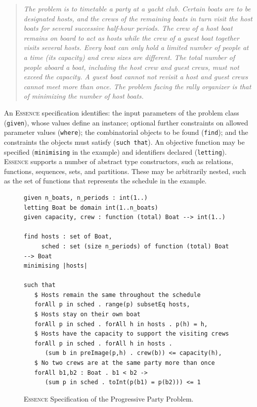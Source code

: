 \documentclass[a4paper,UKenglish,cleveref, autoref,pdfa]{lipics-v2021}
\newcommand{\code}[1]{{\lstinline!#1!}}
\newcommand{\essence}[0]{\textsc{Essence}\xspace}
\begin{document}
\begin{quote}
\em
The problem is to timetable a party at a yacht club. Certain boats are to be designated hosts, and the crews of the remaining boats in turn visit the host boats for several successive half-hour periods. The crew of a host boat remains on board to act as hosts while the crew of a guest boat together visits several hosts. Every boat can only hold a limited number of people at a time (its capacity) and crew sizes are different. The total number of people aboard a boat, including the host crew and guest crews, must not exceed the capacity. A guest boat cannot not revisit a host and guest crews cannot meet more than once. The problem facing the rally organizer is that of minimizing the number of host boats.
\end{quote}

An \essence specification identifies: the input parameters of the problem class (\code{given}), whose values define an instance; optional further constraints on allowed parameter values (\code{where}); the combinatorial objects to be found (\code{find}); and the constraints the objects must satisfy (\code{such that}). An objective function may be specified (\code{minimising} in the example) and identifiers declared (\code{letting}). \essence supports a number of abstract type constructors, such as relations, functions, sequences, sets, and partitions. These may be arbitrarily nested, such as the set of functions that represents the schedule in the example.

\begin{figure}
    \centering
\begin{lstlisting}
given n_boats, n_periods : int(1..)
letting Boat be domain int(1..n_boats)
given capacity, crew : function (total) Boat --> int(1..)
 
find hosts : set of Boat,
     sched : set (size n_periods) of function (total) Boat --> Boat
minimising |hosts|
 
such that
   $ Hosts remain the same throughout the schedule
   forAll p in sched . range(p) subsetEq hosts,
   $ Hosts stay on their own boat
   forAll p in sched . forAll h in hosts . p(h) = h,
   $ Hosts have the capacity to support the visiting crews
   forAll p in sched . forAll h in hosts .
      (sum b in preImage(p,h) . crew(b)) <= capacity(h),
   $ No two crews are at the same party more than once
   forAll b1,b2 : Boat . b1 < b2 ->
      (sum p in sched . toInt(p(b1) = p(b2))) <= 1
\end{lstlisting}
\caption{\label{fig:PPP} \essence Specification of the Progressive Party Problem. }
\end{figure}
\end{document}
